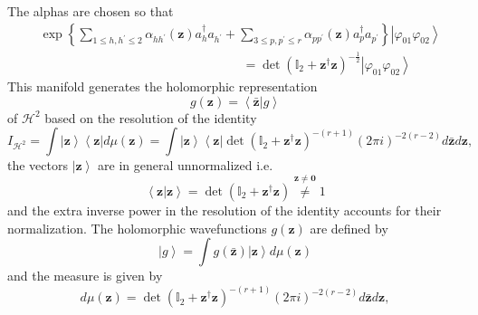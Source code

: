 \documentclass[aps,preprint]{revtex4}%
\begin{document}
The alphas are chosen so that
\begin{align}
&  \exp\left\{  \sum\limits_{1\leq h,h^{\prime}\leq2}\alpha_{hh^{\prime}%
}\left(  \mathbf{z}\right)  a_{h}^{\dagger}a_{h^{\prime}}+\sum\limits_{3\leq
p,p^{\prime}\leq r}\alpha_{pp^{\prime}}\left(  \mathbf{z}\right)
a_{p}^{\dagger}a_{p^{\prime}}\right\}  \left\vert \varphi_{01}\varphi
_{02}\right\rangle \nonumber\\
&  \qquad\qquad\qquad\qquad\qquad\qquad\qquad\qquad\left.  =\right.
\det\left(  \mathbb{I}_{2}+\mathbf{z}^{\dagger}\mathbf{z}\right)  ^{-\frac
{1}{2}}\left\vert \varphi_{01}\varphi_{02}\right\rangle
\end{align}
This manifold generates the holomorphic representation
\begin{equation}
g\left(  \mathbf{z}\right)  =\left\langle \mathbf{\bar{z}}\left\vert g\right.
\right\rangle
\end{equation}
of $\mathcal{H}^{2}$ based on the resolution of the identity
\cite{Blaiz&Orland}
\begin{equation}
I_{\mathcal{H}^{2}}=\int\left\vert \mathbf{z}\right\rangle \left\langle
\mathbf{z}\right\vert d\mu\left(  \mathbf{z}\right)  =\int\left\vert
\mathbf{z}\right\rangle \left\langle \mathbf{z}\right\vert \det\left(
\mathbb{I}_{2}+\mathbf{z}^{\dagger}\mathbf{z}\right)  ^{-\left(  r+1\right)
}\left(  2\pi i\right)  ^{-2\left(  r-2\right)  }d\mathbf{\bar{z}}d\mathbf{z},
\end{equation}
the vectors $\left\vert \mathbf{z}\right\rangle $ are in general unnormalized
i.e.
\begin{equation}
\left\langle \mathbf{z}\left\vert \mathbf{z}\right.  \right\rangle
=\det\left(  \mathbb{I}_{2}+\mathbf{z}^{\dagger}\mathbf{z}\right)
\overset{\mathbf{z\neq0}}{\neq}1
\end{equation}
and the extra inverse power in the resolution of the identity accounts for
their normalization. The holomorphic wavefunctions $g\left(  \mathbf{z}%
\right)  $ are defined by
\begin{equation}
\left\vert g\right\rangle =\int g\left(  \mathbf{\bar{z}}\right)  \left\vert
\mathbf{z}\right\rangle d\mu\left(  \mathbf{z}\right)
\end{equation}
and the measure is given by
\begin{equation}
d\mu\left(  \mathbf{z}\right)  =\det\left(  \mathbb{I}_{2}+\mathbf{z}%
^{\dagger}\mathbf{z}\right)  ^{-\left(  r+1\right)  }\left(  2\pi i\right)
^{-2\left(  r-2\right)  }d\mathbf{\bar{z}}d\mathbf{z,}%
\end{equation}
\end{document}
